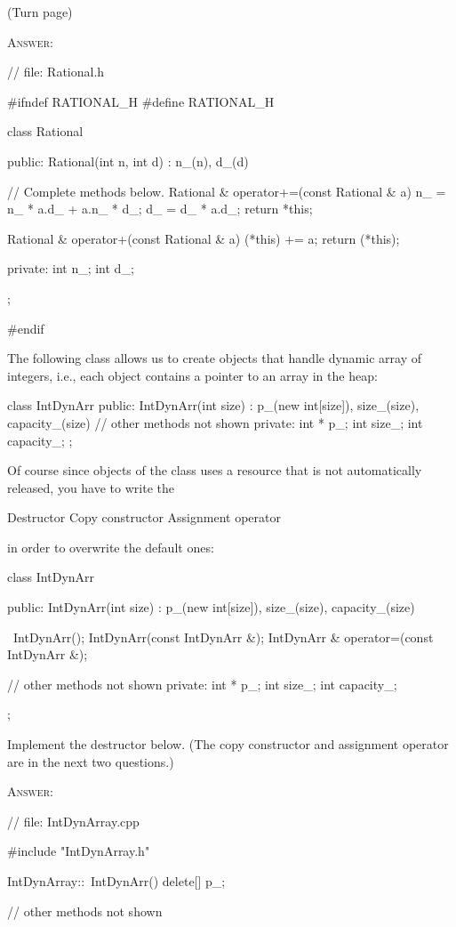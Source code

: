 (Turn page)

\newpage
\textsc{Answer:}
\begin{answercode}
// file: Rational.h

#ifndef RATIONAL_H
#define RATIONAL_H

class Rational
{
public:
    Rational(int n, int d)
        : n_(n), d_(d)
    {}

    // Complete methods below.
    Rational & operator+=(const Rational & a)
    {
      n_ = n_ * a.d_ + a.n_ * d_;
      d_ = d_ * a.d_;
      return *this;
    }

    Rational & operator+(const Rational & a)
    {
      (*this) += a;
      return (*this);
    }
    
private:
    int n_;
    int d_;
};

#endif
\end{answercode}


\newpage
\nextq
The following class allows us to create objects that handle dynamic array of
integers, i.e., each object contains a pointer to an array in the heap:
\begin{console}[fontsize=\small]
class IntDynArr
{
public:
    IntDynArr(int size)
        : p_(new int[size]), size_(size), capacity_(size)
    {}
    // other methods not shown
private:
    int * p_;
    int size_;
    int capacity_;
};
\end{console}
Of course since objects of the class uses a resource that is not automatically
released, you have to write the
\begin{enumerate}[nosep]
\li Destructor
\li Copy constructor
\li Assignment operator
\end{enumerate}
in order to overwrite the default ones:
\begin{console}[fontsize=\small]
class IntDynArr
{
public:
    IntDynArr(int size)
        : p_(new int[size]), size_(size), capacity_(size)
    {}

    ~IntDynArr();
    IntDynArr(const IntDynArr &);
    IntDynArr & operator=(const IntDynArr &);

    // other methods not shown
private:
    int * p_;
    int size_;
    int capacity_;
};
\end{console}

Implement the destructor below.
(The copy constructor and assignment operator are in the next two
questions.)

\textsc{Answer:}
\begin{answercode}
// file: IntDynArray.cpp

#include "IntDynArray.h"

IntDynArray::~IntDynArr()
{
  delete[] p_;
}

// other methods not shown
\end{answercode}


